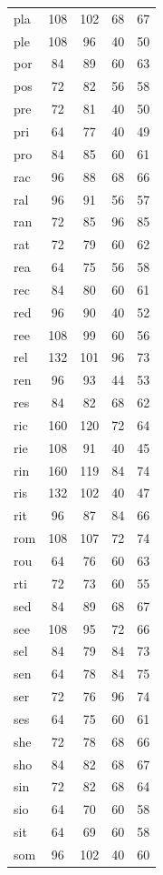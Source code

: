 \documentclass[ms,electronic,twosidetoc,letterpaper,chaptercenter,parttop,lof,lot]{byumsphd}
\begin{document}
\begin{longtable}{| l | c c | c c |}
  pla & 108 & 102 & 68 & 67 \\
  ple & 108 & 96 & 40 & 50 \\
  por & 84 & 89 & 60 & 63 \\
  pos & 72 & 82 & 56 & 58 \\
  pre & 72 & 81 & 40 & 50 \\
  pri & 64 & 77 & 40 & 49 \\
  pro & 84 & 85 & 60 & 61 \\
  rac & 96 & 88 & 68 & 66 \\
  ral & 96 & 91 & 56 & 57 \\
  ran & 72 & 85 & 96 & 85 \\
  rat & 72 & 79 & 60 & 62 \\
  rea & 64 & 75 & 56 & 58 \\
  rec & 84 & 80 & 60 & 61 \\
  red & 96 & 90 & 40 & 52 \\
  ree & 108 & 99 & 60 & 56 \\
  rel & 132 & 101 & 96 & 73 \\
  ren & 96 & 93 & 44 & 53 \\
  res & 84 & 82 & 68 & 62 \\
  ric & 160 & 120 & 72 & 64 \\
  rie & 108 & 91 & 40 & 45 \\
  rin & 160 & 119 & 84 & 74 \\
  ris & 132 & 102 & 40 & 47 \\
  rit & 96 & 87 & 84 & 66 \\
  rom & 108 & 107 & 72 & 74 \\
  rou & 64 & 76 & 60 & 63 \\
  rti & 72 & 73 & 60 & 55 \\
  sed & 84 & 89 & 68 & 67 \\
  see & 108 & 95 & 72 & 66 \\
  sel & 84 & 79 & 84 & 73 \\
  sen & 64 & 78 & 84 & 75 \\
  ser & 72 & 76 & 96 & 74 \\
  ses & 64 & 75 & 60 & 61 \\
  she & 72 & 78 & 68 & 66 \\
  sho & 84 & 82 & 68 & 67 \\
  sin & 72 & 82 & 68 & 64 \\
  sio & 64 & 70 & 60 & 58 \\
  sit & 64 & 69 & 60 & 58 \\
  som & 96 & 102 & 40 & 60 \\

\end{longtable}
\end{document}
